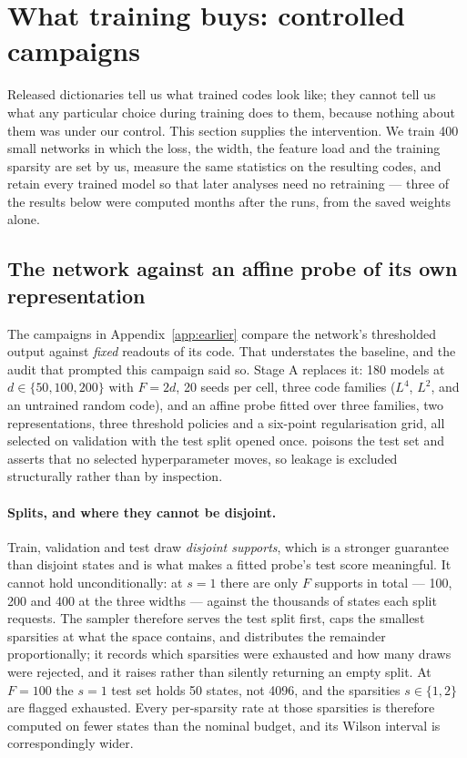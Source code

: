 \section{What training buys: controlled campaigns}
\label{sec:campaigns}
\label{sec:res-primary}

Released dictionaries tell us what trained codes look like; they cannot tell us what any particular
choice during training does to them, because nothing about them was under our control. This section
supplies the intervention. We train 400 small networks in which the loss, the width, the feature load
and the training sparsity are set by us, measure the same statistics on the resulting codes, and
retain every trained model so that later analyses need no retraining --- three of the results below
were computed months after the runs, from the saved weights alone.

\subsection{The network against an affine probe of its own representation}

The campaigns in Appendix~\ref{app:earlier} compare the network's thresholded output against
\emph{fixed} readouts of its code. That understates the baseline, and the audit that prompted this
campaign said so. Stage A replaces it: 180 models at $d\in\{50,100,200\}$ with $F=2d$, 20 seeds per cell, three code families
($L^4$, $L^2$, and an untrained random code), and an affine probe fitted over three families, two
representations, three threshold policies and a six-point regularisation grid, all selected on
validation with the test split opened once.  poisons the test set and
asserts that no selected hyperparameter moves, so leakage is excluded structurally rather than by
inspection.

\paragraph{Splits, and where they cannot be disjoint.} Train, validation and test draw
\emph{disjoint supports}, which is a stronger guarantee than disjoint states and is what makes a
fitted probe's test score meaningful. It cannot hold unconditionally: at $s=1$ there are only $F$
supports in total --- 100, 200 and 400 at the three widths --- against the thousands of states each
split requests. The sampler therefore serves the test split first, caps the smallest sparsities at
what the space contains, and distributes the remainder proportionally; it records which sparsities
were exhausted and how many draws were rejected, and it raises rather than silently returning an
empty split. At $F=100$ the $s=1$ test set holds 50 states, not 4096, and the sparsities $s\in\{1,2\}$
are flagged exhausted. Every per-sparsity rate at those sparsities is therefore computed on fewer
states than the nominal budget, and its Wilson interval is correspondingly wider.

